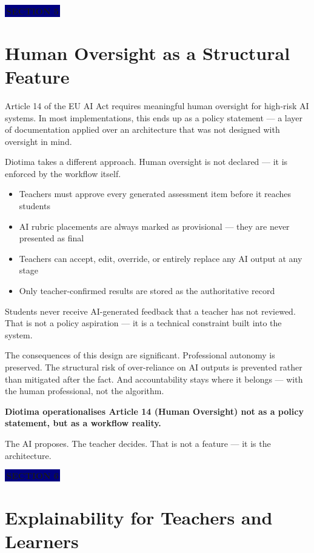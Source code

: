 \documentclass[11pt, a4paper]{article}
\newcommand{\sectiontag}[1]{%
  \vspace{4pt}%
  {\color{white}\colorbox{navy}{\small\bfseries\,#1\,}}%
  \vspace{6pt}%
}
\begin{document}
\sectiontag{SECTION 5}

\section{Human Oversight as a Structural Feature}

Article 14 of the EU AI Act requires meaningful human oversight for high-risk AI systems. In most implementations, this ends up as a policy statement --- a layer of documentation applied over an architecture that was not designed with oversight in mind.

Diotima takes a different approach. Human oversight is not declared --- it is enforced by the workflow itself.

\begin{itemize}
  \item Teachers must approve every generated assessment item before it reaches students
  \item AI rubric placements are always marked as provisional --- they are never presented as final
  \item Teachers can accept, edit, override, or entirely replace any AI output at any stage
  \item Only teacher-confirmed results are stored as the authoritative record
\end{itemize}

Students never receive AI-generated feedback that a teacher has not reviewed. That is not a policy aspiration --- it is a technical constraint built into the system.

The consequences of this design are significant. Professional autonomy is preserved. The structural risk of over-reliance on AI outputs is prevented rather than mitigated after the fact. And accountability stays where it belongs --- with the human professional, not the algorithm.

\begin{callout}
\textbf{Diotima operationalises Article 14 (Human Oversight) not as a policy statement, but as a workflow reality.}

The AI proposes. The teacher decides. That is not a feature --- it is the architecture.
\end{callout}

\sectiontag{SECTION 6}

\section{Explainability for Teachers and Learners}
\end{document}
